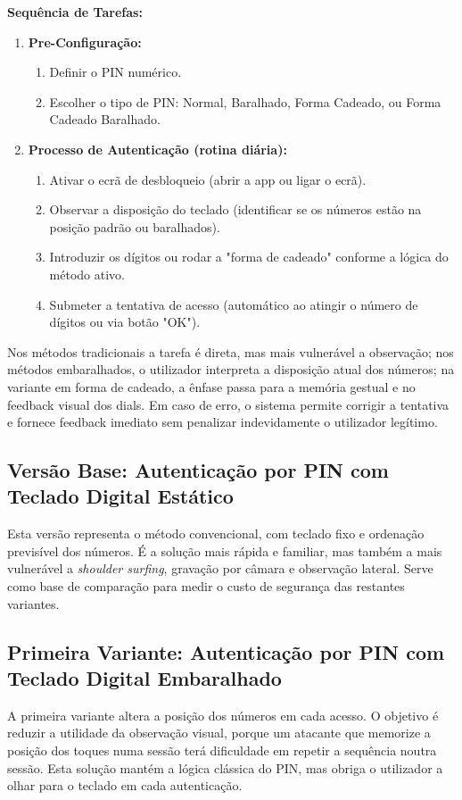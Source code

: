 \documentclass[a4paper]{article}
\begin{document}
\textbf{Sequência de Tarefas:}
\begin{enumerate}
    \item \textbf{Pre-Configuração:} \nobreak\par
    \begin{enumerate}
        \item Definir o PIN numérico.
        \item Escolher o tipo de PIN: Normal, Baralhado, Forma Cadeado, ou Forma Cadeado Baralhado.
    \end{enumerate}
    \item \textbf{Processo de Autenticação (rotina diária):} \nobreak\par
    \begin{enumerate}
        \item Ativar o ecrã de desbloqueio (abrir a app ou ligar o ecrã).
        \item Observar a disposição do teclado (identificar se os números estão na posição padrão ou baralhados).
        \item Introduzir os dígitos ou rodar a "forma de cadeado" conforme a lógica do método ativo.
        \item Submeter a tentativa de acesso (automático ao atingir o número de dígitos ou via botão "OK").
    \end{enumerate}
\end{enumerate}

Nos métodos tradicionais a tarefa é direta, mas mais vulnerável a observação; nos métodos embaralhados, o utilizador interpreta a 
disposição atual dos números; na variante em forma de cadeado, a ênfase passa para a memória gestual e no feedback visual dos dials. 
Em caso de erro, o sistema permite corrigir a tentativa e fornece feedback imediato sem penalizar indevidamente o utilizador legítimo.

\newpage
\subsection{Versão Base: Autenticação por PIN com Teclado Digital Estático}
Esta versão representa o método convencional, com teclado fixo e ordenação previsível dos números. É a solução mais rápida e familiar, 
mas também a mais vulnerável a \textit{shoulder surfing}, gravação por câmara e observação lateral. Serve como base de comparação para 
medir o custo de segurança das restantes variantes.

\subsection{Primeira Variante: Autenticação por PIN com Teclado Digital Embaralhado}
A primeira variante altera a posição dos números em cada acesso. O objetivo é reduzir a utilidade da observação visual, porque um atacante 
que memorize a posição dos toques numa sessão terá dificuldade em repetir a sequência noutra sessão. Esta solução mantém a lógica clássica 
do PIN, mas obriga o utilizador a olhar para o teclado em cada autenticação.
\end{document}
